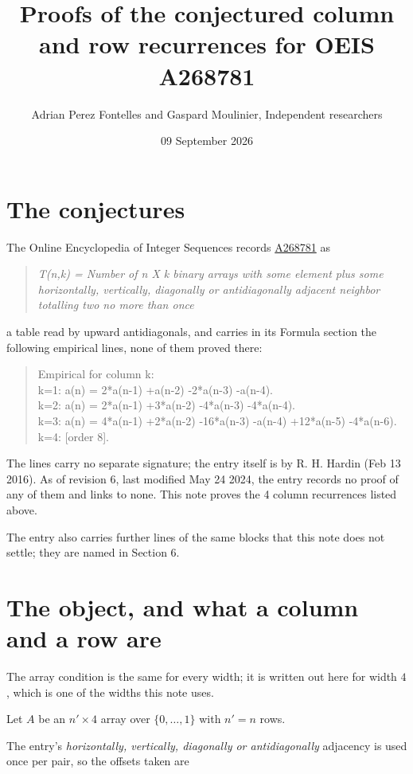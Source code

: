 \documentclass[11pt]{article}
\title{Proofs of the conjectured column and row recurrences for OEIS A268781}
\author{Adrian Perez Fontelles and Gaspard Moulinier, Independent researchers}
\date{09 September 2026}
\theoremstyle{definition}
\begin{document}
\maketitle
\section{The conjectures}

The Online Encyclopedia of Integer Sequences records \href{https://oeis.org/A268781}{A268781} as

\begin{quote}\itshape T(n,k) = Number of n X k binary arrays with some element plus some horizontally, vertically, diagonally or antidiagonally adjacent neighbor totalling two no more than once\end{quote}

a table read by upward antidiagonals, and carries in its Formula section the following empirical lines, none of them proved there:

\begin{quote}\ttfamily Empirical for column k:\\
k=1: a(n) = 2*a(n-1) +a(n-2) -2*a(n-3) -a(n-4).\\k=2: a(n) = 2*a(n-1) +3*a(n-2) -4*a(n-3) -4*a(n-4).\\k=3: a(n) = 4*a(n-1) +2*a(n-2) -16*a(n-3) -a(n-4) +12*a(n-5) -4*a(n-6).\\k=4: [order 8].\end{quote}

The lines carry no separate signature; the entry itself is by R. H. Hardin (Feb 13 2016). As of revision 6, last modified May 24 2024, the entry records no proof of any of them and links to none. This note proves the 4 column recurrences listed above.

The entry also carries further lines of the same blocks that this note does not settle; they are named in Section 6.

\section{The object, and what a column and a row are}

The array condition is the same for every width; it is written out here for width $4$, which is one of the widths this note uses.

Let $A$ be an $n' \times 4$ array over $\{0,\dots,1\}$ with $n' = n$ rows.

The entry's {\itshape horizontally, vertically, diagonally or antidiagonally} adjacency is used once per pair, so the offsets taken are
\end{document}
